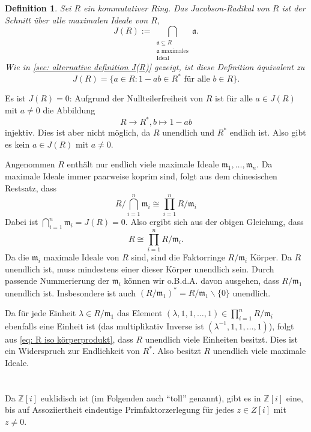 \documentclass[a4paper,10pt]{article}
\newtheorem*{defi}{Definition}
\newcommand{\Z}{\mathbb{Z}}
\newcommand{\mf}[1]{\mathfrak{#1}}
\begin{document}
\section{}

\begin{defi}
 Sei $R$ ein kommutativer Ring. Das \emph{Jacobson-Radikal} von $R$ ist der Schnitt über alle maximalen Ideale von $R$,
 \[
  J(R)
  := \bigcap_{\substack{\mf{a} \subseteq R \\ \text{$\mf{a}$ maximales} \\ \text{Ideal}}} \mf{a}.
 \]
 Wie in \ref{sec: alternative definition J(R)} gezeigt, ist diese Definition äquivalent zu
 \[
  J(R) = \{a \in R : 1-ab \in R^* \text{ für alle } b \in R\}.
 \]
\end{defi}

Es ist $J(R) = 0$: Aufgrund der Nullteilerfreiheit von $R$ ist für alle $a \in J(R)$ mit $a \neq 0$ die Abbildung
\[
 R \rightarrow R^*, b \mapsto 1-ab
\]
injektiv. Dies ist aber nicht möglich, da $R$ unendlich und $R^*$ endlich ist. Also gibt es kein $a \in J(R)$ mit $a \neq 0$.

Angenommen $R$ enthält nur endlich viele maximale Ideale $\mf{m}_1, \ldots, \mf{m}_n$. Da maximale Ideale immer paarweise koprim sind, folgt aus dem chinesischen Restsatz, dass
\[
 R/\bigcap_{i=1}^n \mf{m}_i \cong \prod_{i=1}^n R/\mf{m}_i
\]
Dabei ist $\bigcap_{i=1}^n \mf{m}_i = J(R) = 0$. Also ergibt sich aus der obigen Gleichung, dass
\begin{equation}\label{eq: R iso körperprodukt}
 R \cong \prod_{i=1}^n R/\mf{m}_i.
\end{equation}
Da die $\mf{m}_i$ maximale Ideale von $R$ sind, sind die Faktorringe $R/\mf{m}_i$ Körper. Da $R$ unendlich ist, muss mindestens einer dieser Körper unendlich sein. Durch passende Nummerierung der $\mf{m}_i$ können wir o.B.d.A. davon ausgehen, dass $R/\mf{m}_1$ unendlich ist. Insbesondere ist auch $(R/\mf{m}_1)^* = R/\mf{m}_1 \smallsetminus \{0\}$ unendlich.

Da für jede Einheit $\lambda \in R/\mf{m}_1$ das Element $(\lambda, 1, 1, \ldots, 1) \in \prod_{i=1}^n R/\mf{m}_i$ ebenfalls eine Einheit ist (das multiplikativ Inverse ist $(\lambda^{-1}, 1, 1, \ldots, 1)$), folgt aus \eqref{eq: R iso körperprodukt}, dass $R$ unendlich viele Einheiten besitzt. Dies ist ein Widerspruch zur Endlichkeit von $R^*$. Also besitzt $R$ unendlich viele maximale Ideale.





\section{}
Da $\Z[i]$ euklidisch ist (im Folgenden auch "`toll"' genannt), gibt es in $\Z[i]$ eine, bis auf Assoziiertheit eindeutige Primfaktorzerlegung für jedes $z \in Z[i]$ mit $z \neq 0$.
\end{document}
